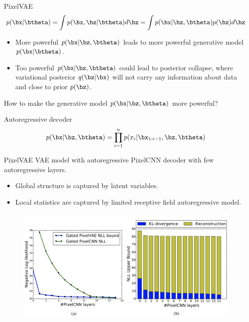 \begin{frame}{PixelVAE}
	\[
	    p(\bx | \btheta) = \int p(\bx, \bz | \btheta) d \bz = \int p(\bx | \bz, \btheta) p(\bz) d \bz 
	\]
	\begin{itemize}
		\item More powerful $p(\bx | \bz, \btheta)$ leads to more powerful generative model $p(\bx | \btheta)$.
		\item Too powerful $p(\bx | \bz, \btheta)$ could lead to posterior collapse, where variational posterior $q(\bz | \bx)$ will not carry any information about data and close to prior $p(\bz)$.
	\end{itemize}
	How to make the generative model $p(\bx | \bz, \btheta)$ more powerful?
	\begin{block}{Autoregressive decoder}
	\[
	    p(\bx | \bz , \btheta) = \prod_{i=1}^n p(x_i | \bx_{1:i - 1}, \bz , \btheta)
	\]
	\end{block}
	
\end{frame}
\begin{frame}{PixelVAE}
	VAE model with autoregressive PixelCNN decoder with few autoregressive layers. 
	\begin{itemize}
		\item Global structure is captured by latent variables.
		\item Local statistics are captured by limited receptive field autoregressive model.
	\end{itemize}
	\begin{figure}
	    \centering
	    \includegraphics[width=0.8\linewidth]{figs/PixelVAE_2.png}
	\end{figure}
		
\end{frame}
